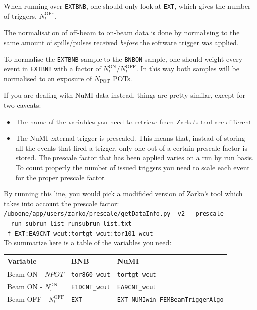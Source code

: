 \documentclass[a4paper, oneside, 12pt, onecolumn]{article}
\newcommand{\extbnb}{\texttt{EXTBNB}\xspace}
\newcommand{\bnbon}{\texttt{BNBON}\xspace}
\begin{document}
When running over \extbnb, one should only look at \texttt{EXT}, which gives the number of triggers, $N_t^\text{OFF}$. 

The normalisation of off-beam to on-beam data is done by normalising to the same amount of spills/pulses received \emph{before} the software trigger was applied.

To normalise the \extbnb sample to the \bnbon sample, one should weight every event in \extbnb with a factor of $N_t^\text{ON}/N_t^\text{OFF}$. In this way both samples will be normalised to an exposure of $N_\text{POT}$ POTs.

If you are dealing with NuMI data instead, things are pretty similar, except for two caveats:
\begin{itemize}
    \item The name of the variables you need to retrieve from Zarko's tool are different
    \item The NuMI external trigger is prescaled. This means that, instead of storing all the events that fired a trigger, only one out of a certain prescale factor is stored. The prescale factor that has been applied varies on a run by run basis. To count properly the number of issued triggers you need to scale each event for the proper prescale factor.
\end{itemize}

By running this line, you would pick a modifided version of Zarko's tool which takes into account the prescale factor:\\
\texttt{/uboone/app/users/zarko/prescale/getDataInfo.py -v2 -\/-prescale\\ -\/-run-subrun-list runsubrun\_list.txt \\-f EXT:EA9CNT\_wcut:tortgt\_wcut:tor101\_wcut }\\

To summarize here is a table of the variables you need:

\begin{table}[!h]
\begin{tabular}{l|l|l}
Variable            & BNB                                    & NuMI \\
\hline
Beam ON - $N POT$  & \texttt{tor860\_wcut} & \texttt{tortgt\_wcut}\\
Beam ON - $N_t^\text{ON}$  & \texttt{E1DCNT\_wcut} & \texttt{EA9CNT\_wcut}\\
Beam OFF - $N_t^\text{OFF}$ & \texttt{EXT}          & \texttt{EXT\_NUMIwin\_FEMBeamTriggerAlgo}
\end{tabular}
\end{table}
\end{document}
